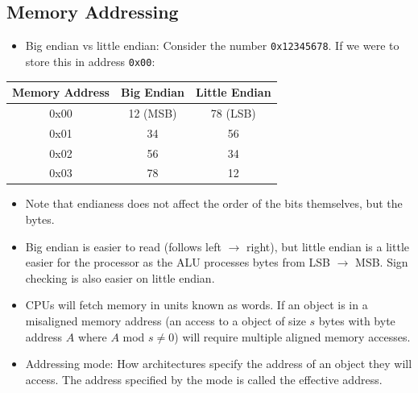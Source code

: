 \documentclass[11pt, a4paper]{article}
\theoremstyle{definition}
\theoremstyle{remark}
\begin{document}
\subsection{Memory Addressing}
\begin{itemize}
  \item Big endian vs little endian: Consider the number \texttt{0x12345678}. If we were to store this in address \texttt{0x00}:
\end{itemize}
\begin{center}
\begin{tabular} {c c c}
\hline 
Memory Address & Big Endian & Little Endian \\
\hline 
\hline 
0x00 & 12 (MSB) & 78 (LSB) \\
0x01 & 34 & 56 \\
0x02 & 56 & 34 \\ 
0x03 & 78 & 12 \\
\hline
\end{tabular}
\end{center}
\begin{itemize}
  \item Note that endianess does not affect the order of the bits themselves, but the bytes.
  \item Big endian is easier to read (follows left $\rightarrow$ right), but little endian is a little easier for the processor as the ALU processes bytes from LSB $\rightarrow$ MSB. Sign checking is also easier on little endian.
  \item CPUs will fetch memory in units known as words. If an object is in a misaligned memory address (an access to a object of size $s$ bytes with byte address $A$ where $A$ mod $s \neq 0$) will require multiple aligned memory accesses.
  \item Addressing mode: How architectures specify the address of an object they will access. The address specified by the mode is called the effective address.
\end{itemize}
\end{document}
